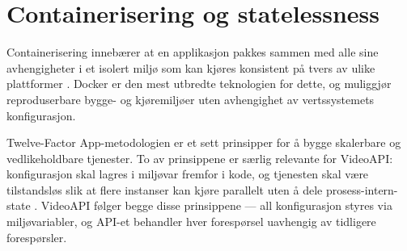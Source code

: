 \section{Containerisering og statelessness}
\label{sec:containerisering-statelessness}

Containerisering innebærer at en applikasjon pakkes sammen med alle sine avhengigheter
i et isolert miljø som kan kjøres konsistent på tvers av ulike plattformer \cite{docker_docs}.
Docker er den mest utbredte teknologien for dette, og muliggjør reproduserbare bygge-
og kjøremiljøer uten avhengighet av vertssystemets konfigurasjon.

Twelve-Factor App-metodologien er et sett prinsipper for å bygge skalerbare og vedlikeholdbare tjenester. To av prinsippene er særlig relevante for VideoAPI: konfigurasjon skal lagres i \gls{miljøvar} fremfor i kode, og tjenesten skal være tilstandsløs slik at flere instanser kan kjøre parallelt uten å dele \gls{prosess-intern-state} \cite{twelve_factor}. VideoAPI følger begge disse prinsippene — all konfigurasjon styres via miljøvariabler, og API-et behandler hver forespørsel uavhengig av tidligere forespørsler.
